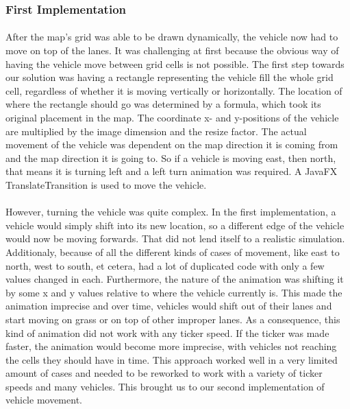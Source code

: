 \documentclass[a4paper,11pt,titlepage]{article}
\begin{document}
\subsubsection{First Implementation}
\paragraph{}
After the map's grid was able to be drawn dynamically, the vehicle now had to move on top of the lanes. It was challenging at first because the obvious way of having the vehicle move between grid cells is not possible. The first step towards our solution was having a rectangle representing the vehicle fill the whole grid cell, regardless of whether it is moving vertically or horizontally. The location of where the rectangle should go was determined by a formula, which took its original placement in the map. The coordinate x- and y-positions of the vehicle are multiplied by the image dimension and the resize factor. The actual movement of the vehicle was dependent on the map direction it is coming from and the map direction it is going to. So if a vehicle is moving east, then north, that means it is turning left and a left turn animation was required. A JavaFX TranslateTransition is used to move the vehicle.
\paragraph{}
However, turning the vehicle was quite complex. In the first implementation, a vehicle would simply shift into its new location, so a different edge of the vehicle would now be moving forwards. That did not lend itself to a realistic simulation. Additionaly, because of all the different kinds of cases of movement, like east to north, west to south, et cetera, had a lot of duplicated code with only a few values changed in each. Furthermore, the nature of the animation was shifting it by some x and y values relative to where the vehicle currently is. This made the animation imprecise and over time, vehicles would shift out of their lanes and start moving on grass or on top of other improper lanes. As a consequence, this kind of animation did not work with any ticker speed. If the ticker was made faster, the animation would become more imprecise, with vehicles not reaching the cells they should have in time. This approach worked well in a very limited amount of cases and needed to be reworked to work with a variety of ticker speeds and many vehicles. This brought us to our second implementation of vehicle movement.
\end{document}
